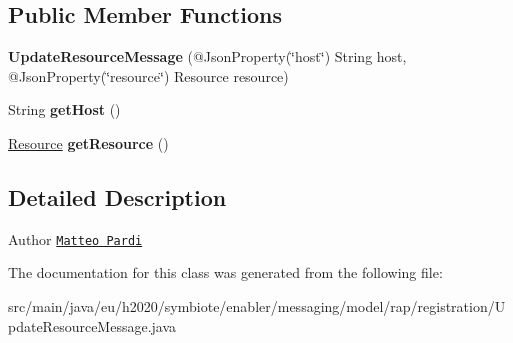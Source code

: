 \subsection*{Public Member Functions}
\begin{DoxyCompactItemize}
\item 
\mbox{\label{classeu_1_1h2020_1_1symbiote_1_1enabler_1_1messaging_1_1model_1_1rap_1_1registration_1_1UpdateResourceMessage_aefd6a79ac6b7cffd6c08d7e66fa5bed4}} 
{\bfseries Update\+Resource\+Message} (@Json\+Property(\char`\"{}host\char`\"{}) String host, @Json\+Property(\char`\"{}resource\char`\"{}) Resource resource)
\item 
\mbox{\label{classeu_1_1h2020_1_1symbiote_1_1enabler_1_1messaging_1_1model_1_1rap_1_1registration_1_1UpdateResourceMessage_a11e0555a864b55534fcde2005a52aa66}} 
String {\bfseries get\+Host} ()
\item 
\mbox{\label{classeu_1_1h2020_1_1symbiote_1_1enabler_1_1messaging_1_1model_1_1rap_1_1registration_1_1UpdateResourceMessage_a3c33548dcda2a2dd894ead7855755440}} 
\hyperlink{classeu_1_1h2020_1_1symbiote_1_1model_1_1cim_1_1Resource}{Resource} {\bfseries get\+Resource} ()
\end{DoxyCompactItemize}


\subsection{Detailed Description}
\begin{DoxyAuthor}{Author}
\href{mailto:m.pardi@nextworks.it}{\tt Matteo Pardi} 
\end{DoxyAuthor}


The documentation for this class was generated from the following file\+:\begin{DoxyCompactItemize}
\item 
src/main/java/eu/h2020/symbiote/enabler/messaging/model/rap/registration/Update\+Resource\+Message.\+java\end{DoxyCompactItemize}
